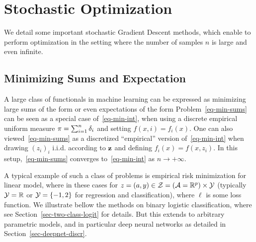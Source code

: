 
\section{Stochastic Optimization}
\label{sec-stochastic-optim}

We detail some important stochastic Gradient Descent methods, which enable to perform optimization in the setting where the number of samples $n$ is large and even infinite. 


\subsection{Minimizing Sums and Expectation}

A large class of functionals in machine learning can be expressed as minimizing large sums of the form
or even expectations of the form
Problem~\eqref{eq-min-sums} can be seen as a special case of~\eqref{eq-min-int}, when using a discrete empirical uniform measure $\pi = \sum_{i=1}^n \delta_i$ and setting $f(x,i)=f_i(x)$. One can also viewed~\eqref{eq-min-sums} as a discretized ``empirical'' version of~\eqref{eq-min-int} when drawing $(z_i)_i$ i.i.d. according to $\mathrm{\bf z}$ and defining $f_i(x)=f(x,z_i)$. In this setup,~\eqref{eq-min-sums} converges to~\eqref{eq-min-int} as $n \rightarrow +\infty$.

A typical example of such a class of problems is empirical risk minimization for linear model, where in these cases
for $z=(a,y) \in \mathcal{Z} = (\mathcal{A}=\mathbb{R}^p) \times \mathcal{Y}$ (typically $\mathcal{Y}=\mathbb{R}$ or $\mathcal{Y}=\{-1,2\}$ for regression and classification), where $\ell$ is some loss function. 
%
We illustrate bellow the methods on binary logistic classification, where
see Section~\ref{sec-two-class-logit} for details. But this extends to arbitrary parametric models, and in particular deep neural networks as detailed in Section~\ref{sec-deepnet-discr}. 

